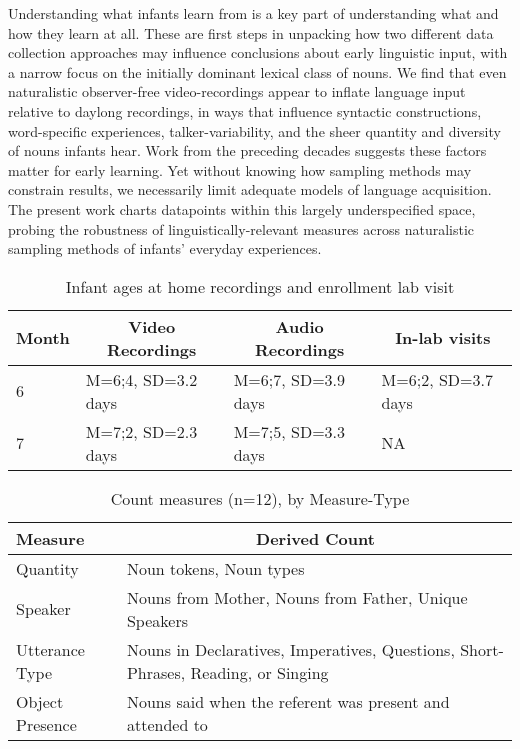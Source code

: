 \documentclass[man]{apa6}
\theoremstyle{definition}
\theoremstyle{definition}
\theoremstyle{definition}
\theoremstyle{remark}
\begin{document}
Understanding what infants learn from is a key part of understanding
what and how they learn at all. These are first steps in unpacking how
two different data collection approaches may influence conclusions about
early linguistic input, with a narrow focus on the initially dominant
lexical class of nouns. We find that even naturalistic observer-free
video-recordings appear to inflate language input relative to daylong
recordings, in ways that influence syntactic constructions,
word-specific experiences, talker-variability, and the sheer quantity
and diversity of nouns infants hear. Work from the preceding decades
suggests these factors matter for early learning. Yet without knowing
how sampling methods may constrain results, we necessarily limit
adequate models of language acquisition. The present work charts
datapoints within this largely underspecified space, probing the
robustness of linguistically-relevant measures across naturalistic
sampling methods of infants' everyday experiences.\newpage

\begin{table}[tbp]
\begin{center}
\begin{threeparttable}
\caption{\label{tab:recording-ages-table}Infant ages at home recordings and enrollment lab visit}
\begin{tabular}{llll}
\toprule
Month & \multicolumn{1}{c}{Video Recordings} & \multicolumn{1}{c}{Audio Recordings} & \multicolumn{1}{c}{In-lab visits}\\
\midrule
6 & M=6;4, SD=3.2 days & M=6;7, SD=3.9 days & M=6;2, SD=3.7 days\\
7 & M=7;2, SD=2.3 days & M=7;5, SD=3.3 days & NA\\
\bottomrule
\end{tabular}
\end{threeparttable}
\end{center}
\end{table}

\pagebreak

\begin{table}[tbp]
\begin{center}
\begin{threeparttable}
\caption{\label{tab:measures-tab}Count measures (n=12), by Measure-Type}
\small{
\begin{tabular}{ll}
\toprule
Measure & \multicolumn{1}{c}{Derived Count}\\
\midrule
Quantity & Noun tokens, Noun types\\
Speaker & Nouns from Mother, Nouns from Father, Unique Speakers\\
Utterance Type & Nouns in Declaratives, Imperatives, Questions, Short-Phrases, Reading, or Singing\\
Object Presence & Nouns said when the referent was present and attended to\\
\bottomrule
\end{tabular}
}
\end{threeparttable}
\end{center}
\end{table}
\end{document}
